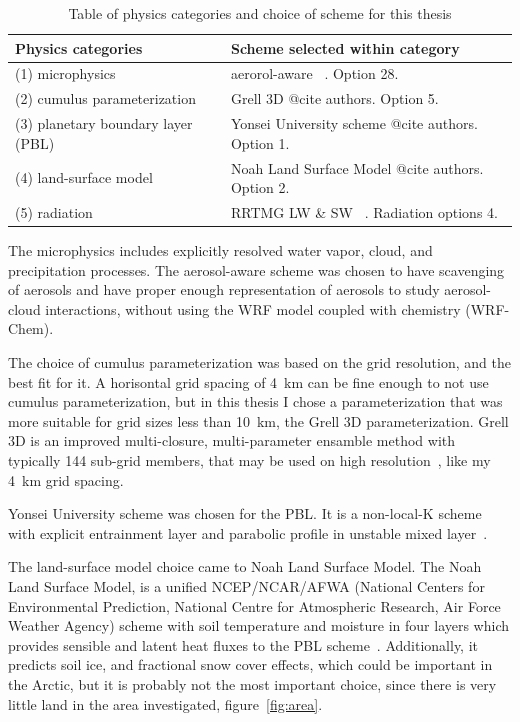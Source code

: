 \begin{table}[H]
\centering
\caption{Table of physics categories and choice of scheme for this thesis}
\label{tab:physics} 
\begin{tabular}{L{6.cm} L{6.cm}}
\centering
\textbf{Physics categories} & \textbf{Scheme selected within category}\\ \hline
(1) microphysics & aerorol-aware ~\citep{Reisner1998, Thompson2004, Thompson2008, Thompson2014}. Option 28.\\
(2) cumulus parameterization & Grell 3D  @cite authors. Option 5.\\
(3) planetary boundary layer (PBL) &  Yonsei University scheme @cite authors. Option 1.\\
(4) land-surface model & Noah Land Surface Model @cite authors. Option 2.\\
(5) radiation & RRTMG LW \& SW ~\citep{Mlawer1997, Iacono2000, Iacono2003, Iacono2008}. Radiation options 4.\\
\end{tabular}
\end{table}

The microphysics includes explicitly resolved water vapor, cloud, and precipitation processes. The aerosol-aware scheme was chosen to have scavenging of aerosols and have proper enough representation of aerosols to study aerosol-cloud interactions, without using the WRF model coupled with chemistry (WRF-Chem).

The choice of cumulus parameterization was based on the grid resolution, and the best fit for it. A horisontal grid spacing of 4~km can be fine enough to not use cumulus parameterization, but in this thesis I chose a parameterization that was more suitable for grid sizes less than 10~km, the Grell 3D parameterization. Grell 3D is an improved multi-closure, multi-parameter ensamble method with typically 144 sub-grid members, that may be used on high resolution~\citep{Wang2015}, like my 4~km grid spacing.

Yonsei University scheme was chosen for the PBL. It is a non-local-K scheme with explicit entrainment layer and parabolic profile in unstable mixed layer~\citep{Wang2015}.

The land-surface model choice came to Noah Land Surface Model. The Noah Land Surface Model, is a unified NCEP/NCAR/AFWA (National Centers for Environmental Prediction, National Centre for Atmospheric Research, Air Force Weather Agency) scheme with soil temperature and moisture in four layers which provides sensible and latent heat fluxes to the PBL scheme~\citep{Wang2015}. Additionally, it predicts soil ice, and fractional snow cover effects, which could be important in the Arctic, but it is probably not the most important choice, since there is very little land in the area investigated, figure~\ref{fig:area}.

